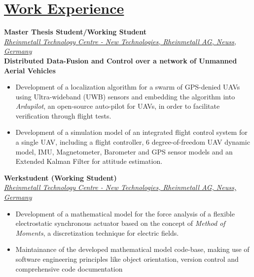 
\section{\underline{Work Experience}}

\large{\textbf{Master Thesis Student/Working Student}}
\hfill
\masterarbeitdate\\
\href{https://www.rheinmetall.com/de/karriere/rheinmetall-als-arbeitgeber/menschen-projekte/karriere-extra-technology-center}{\large{\emph{Rheinmetall Technology Centre - New Technologies, Rheinmetall AG, Neuss, Germany}}}\\
\large{\textbf{Distributed Data-Fusion and Control over a network of Unmanned Aerial Vehicles}}
\begin{itemize}
	\item Development of a localization algorithm for a swarm of GPS-denied UAVs using Ultra-wideband (UWB) sensors and embedding the algorithm into \emph{Ardupilot}, an open-source auto-pilot for UAVs, in order to facilitate verification through flight tests.
    \item Development of a simulation model of an integrated flight control system for a single UAV, including a flight controller, 6 degree-of-freedom UAV dynamic model, IMU, Magnetometer, Barometer and GPS sensor models and an Extended Kalman Filter for attitude estimation.
\end{itemize}

\vspace{0.1 in}

\large{\textbf{Werkstudent (Working Student)}}
\hfill
\rheinmetalldate\\
\href{https://www.rheinmetall.com/de/karriere/rheinmetall-als-arbeitgeber/menschen-projekte/karriere-extra-technology-center}{\large{\emph{Rheinmetall Technology Centre - New Technologies, Rheinmetall AG, Neuss, Germany}}}
\begin{itemize}
\item\large{Development of a mathematical model for the force analysis of a flexible electrostatic synchronous actuator based on the concept of \emph{Method of Moments}, a discretization technique for electric fields.}
\item\large{Maintainance of the developed mathematical model code-base, making use of software engineering principles like object orientation, version control and comprehensive code documentation}
\end{itemize}


